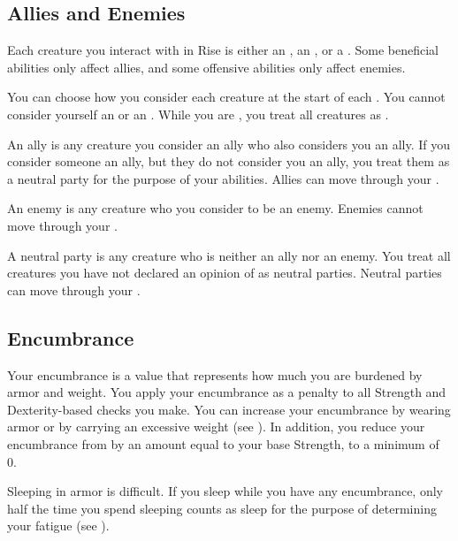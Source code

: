     \subsection{Allies and Enemies}\label{Allies and Enemies}
        Each creature you interact with in Rise is either an , an , or a .
        Some beneficial abilities only affect allies, and some offensive abilities only affect enemies.

        You can choose how you consider each creature at the start of each .
        You cannot consider yourself an  or an .
        While you are , you treat all creatures as .

         An ally is any creature you consider an ally who also considers you an ally.
        If you consider someone an ally, but they do not consider you an ally, you treat them as a neutral party for the purpose of your abilities.
        Allies can move through your .

         An enemy is any creature who you consider to be an enemy.
        Enemies cannot move through your .

         A neutral party is any creature who is neither an ally nor an enemy.
        You treat all creatures you have not declared an opinion of as neutral parties.
        Neutral parties can move through your .

    \subsection{Encumbrance}\label{Encumbrance}
        Your encumbrance is a value that represents how much you are burdened by armor and weight.
        You apply your encumbrance as a penalty to all Strength and Dexterity-based checks you make.
        You can increase your encumbrance by wearing armor or by carrying an excessive weight (see ).
        In addition, you reduce your encumbrance from  by an amount equal to your base Strength, to a minimum of 0.

        Sleeping in armor is difficult.
        If you sleep while you have any encumbrance, only half the time you spend sleeping counts as sleep for the purpose of determining your fatigue (see ).

